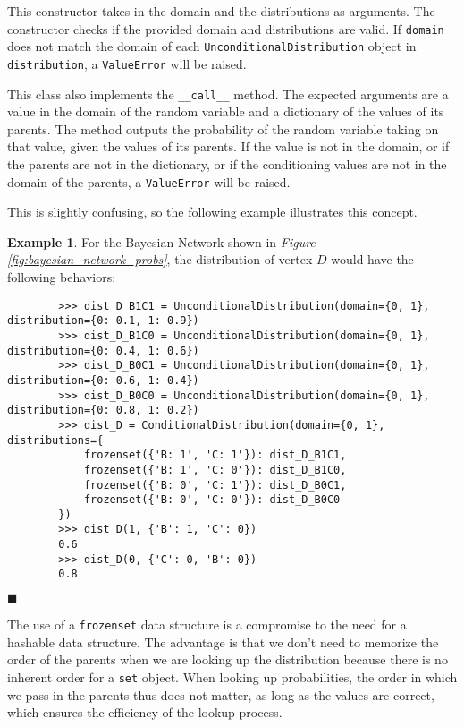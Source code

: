 \documentclass{article}
\theoremstyle{definition}
\newtheorem{example}{Example}
\newenvironment{exampleqed}
    {\begin{example}}
    {\hfill \qedsymbol \end{example}}
\renewcommand{\qedsymbol}{\(\blacksquare\)}
\begin{document}
This constructor takes in the domain and the distributions as arguments. The constructor checks if the provided domain and distributions are valid. If \texttt{domain} does not match the domain of each \texttt{UnconditionalDistribution} object in \texttt{distribution}, a \texttt{ValueError} will be raised.

This class also implements the \texttt{\_\_call\_\_} method. The expected arguments are a value in the domain of the random variable and a dictionary of the values of its parents. The method outputs the probability of the random variable taking on that value, given the values of its parents. If the value is not in the domain, or if the parents are not in the dictionary, or if the conditioning values are not in the domain of the parents, a \texttt{ValueError} will be raised.

This is slightly confusing, so the following example illustrates this concept.

\begin{exampleqed}
    For the Bayesian Network shown in \textit{Figure \ref{fig:bayesian_network_probs}}, the distribution of vertex \(D\) would have the following behaviors:

    \begin{verbatim}
        >>> dist_D_B1C1 = UnconditionalDistribution(domain={0, 1}, distribution={0: 0.1, 1: 0.9})
        >>> dist_D_B1C0 = UnconditionalDistribution(domain={0, 1}, distribution={0: 0.4, 1: 0.6})
        >>> dist_D_B0C1 = UnconditionalDistribution(domain={0, 1}, distribution={0: 0.6, 1: 0.4})
        >>> dist_D_B0C0 = UnconditionalDistribution(domain={0, 1}, distribution={0: 0.8, 1: 0.2})
        >>> dist_D = ConditionalDistribution(domain={0, 1}, distributions={
            frozenset({'B: 1', 'C: 1'}): dist_D_B1C1,
            frozenset({'B: 1', 'C: 0'}): dist_D_B1C0,
            frozenset({'B: 0', 'C: 1'}): dist_D_B0C1,
            frozenset({'B: 0', 'C: 0'}): dist_D_B0C0
        })
        >>> dist_D(1, {'B': 1, 'C': 0})
        0.6
        >>> dist_D(0, {'C': 0, 'B': 0})
        0.8
    \end{verbatim}
\end{exampleqed}

The use of a \texttt{frozenset} data structure is a compromise to the need for a hashable data structure. The advantage is that we don't need to memorize the order of the parents when we are looking up the distribution because there is no inherent order for a \texttt{set} object. When looking up probabilities, the order in which we pass in the parents thus does not matter, as long as the values are correct, which ensures the efficiency of the lookup process.
\end{document}

